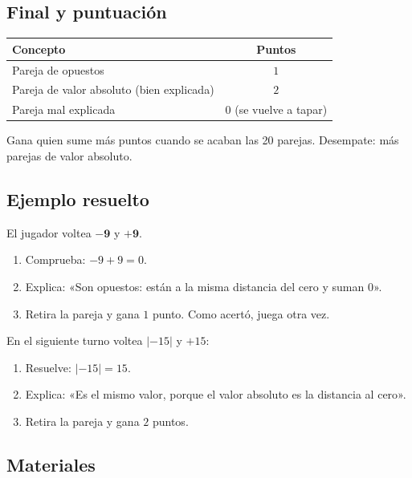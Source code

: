 \documentclass[12pt, letterpaper]{article}
\newcommand{\abs}[1]{\lvert #1\rvert}
\begin{document}
\subsection{Final y puntuación}

\begin{center}
\small
\begin{tabular}{@{}p{8.6cm} c@{}}
\toprule
\textbf{Concepto} & \textbf{Puntos}\\
\midrule
Pareja de opuestos & $1$\\
Pareja de valor absoluto (bien explicada) & $2$\\
Pareja mal explicada & $0$ (se vuelve a tapar)\\
\bottomrule
\end{tabular}
\end{center}

Gana quien sume más puntos cuando se acaban las 20 parejas. Desempate: más parejas de valor absoluto.

\subsection{Ejemplo resuelto}

El jugador voltea $\mathbf{-9}$ y $\mathbf{+9}$.

\begin{cuadrosolucion}
\begin{enumerate}[leftmargin=*]
  \item Comprueba: $-9+9=0$.
  \item Explica: «Son opuestos: están a la misma distancia del cero y suman $0$».
  \item Retira la pareja y gana $1$ punto. Como acertó, juega otra vez.
\end{enumerate}
En el siguiente turno voltea $\abs{-15}$ y $+15$:
\begin{enumerate}[leftmargin=*]
  \item Resuelve: $\abs{-15}=15$.
  \item Explica: «Es el mismo valor, porque el valor absoluto es la distancia al cero».
  \item Retira la pareja y gana $2$ puntos.
\end{enumerate}
\end{cuadrosolucion}

\subsection{Materiales}
\end{document}
